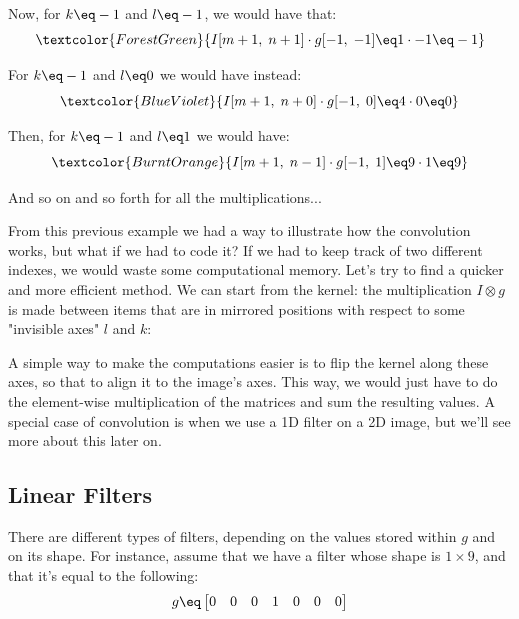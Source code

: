 \begin{example}
    Now, for $k \eq -1$ and $l \eq -1$, we would have that:
    \[ \textcolor{ForestGreen}{I[m + 1, \; n + 1] \cdot g[-1, \; -1] \eq 1 \cdot -1 \eq -1} \]

    For $k \eq -1$ and $l \eq 0$ we would have instead:
    \[ \textcolor{BlueViolet}{I[m + 1, \; n + 0] \cdot g[-1, \; 0] \eq 4 \cdot 0 \eq 0} \]

    Then, for $k \eq -1$ and $l \eq 1$ we would have:
    \[ \textcolor{BurntOrange}{I[m + 1, \; n - 1] \cdot g[-1, \; 1] \eq 9 \cdot 1 \eq 9} \]

    And so on and so forth for all the multiplications...
\end{example}

From this previous example we had a way to illustrate how the convolution works, but what if we had to code it? If we had to keep track of two different indexes, we would waste some computational memory. Let's try to find a quicker and more efficient method. We can start from the kernel: the multiplication $I \otimes g$ is made between items that are in mirrored positions with respect to some "invisible axes" $l$ and $k$:

\begin{center}
\end{center}

A simple way to make the computations easier is to flip the kernel along these axes, so that to align it to the image's axes. This way, we would just have to do the element-wise multiplication of the matrices and sum the resulting values.
\nl
A special case of convolution is when we use a 1D filter on a 2D image, but we'll see more about this later on.

\subsection{Linear Filters}

There are different types of filters, depending on the values stored within $g$ and on its shape. For instance, assume that we have a filter whose shape is $1 \times 9$, and that it's equal to the following:
\[ g \eq \begin{bmatrix}
    0 & 0 & 0 & 1 & 0 & 0 & 0
\end{bmatrix} \]

